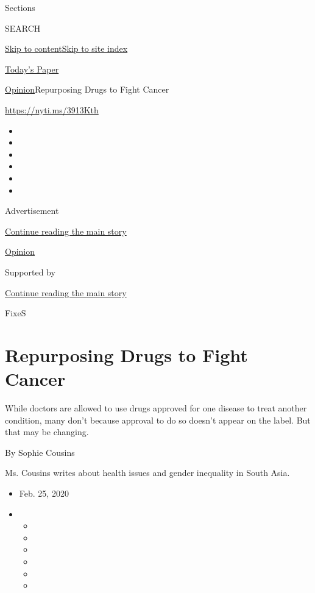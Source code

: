 Sections

SEARCH

\protect\hyperlink{site-content}{Skip to
content}\protect\hyperlink{site-index}{Skip to site index}

\href{https://myaccount.nytimes.com/auth/login?response_type=cookie\&client_id=vi}{}

\href{https://www.nytimes.com/section/todayspaper}{Today's Paper}

\href{/section/opinion}{Opinion}\textbar{}Repurposing Drugs to Fight
Cancer

\href{https://nyti.ms/3913Kth}{https://nyti.ms/3913Kth}

\begin{itemize}
\item
\item
\item
\item
\item
\item
\end{itemize}

Advertisement

\protect\hyperlink{after-top}{Continue reading the main story}

\href{/section/opinion}{Opinion}

Supported by

\protect\hyperlink{after-sponsor}{Continue reading the main story}

FixeS

\hypertarget{repurposing-drugs-to-fight-cancer}{%
\section{Repurposing Drugs to Fight
Cancer}\label{repurposing-drugs-to-fight-cancer}}

While doctors are allowed to use drugs approved for one disease to treat
another condition, many don't because approval to do so doesn't appear
on the label. But that may be changing.

By Sophie Cousins

Ms. Cousins writes about health issues and gender inequality in South
Asia.

\begin{itemize}
\item
  Feb. 25, 2020
\item
  \begin{itemize}
  \item
  \item
  \item
  \item
  \item
  \item
  \end{itemize}
\end{itemize}

